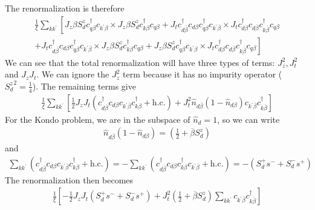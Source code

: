 \documentclass[twoside,11pt]{report}
\numberwithin{equation}{section}
\begin{document}
The renormalization is therefore
\begin{equation}\begin{aligned}
	\frac{1}{\xi}\sum_{kk^\prime} \left[J_z \beta S_d^z c^\dagger_{q\beta}c_{k^\prime\beta}\times J_z \beta S_d^z c^\dagger_{k\beta}c_{q\beta} + J_t  c^\dagger_{d\overline\beta}c_{d\beta} c^\dagger_{q\beta}c_{k^\prime\overline\beta} \times J_t  c^\dagger_{d\beta}c_{d\overline\beta} c^\dagger_{k\overline\beta}c_{q\beta}\right.\\
	+\left. J_t  c^\dagger_{d\overline\beta}c_{d\beta} c^\dagger_{q\beta}c_{k^\prime\overline\beta}\times J_z \beta S_d^z c^\dagger_{k\beta}c_{q\beta} + J_z \beta S_d^z c^\dagger_{q\beta}c_{k^\prime\beta}\times J_t  c^\dagger_{d\beta}c_{d\overline\beta} c^\dagger_{k\overline\beta}c_{q\beta}\right]
\end{aligned}\end{equation}
We can see that the total renormalization will have three types of terms: \(J_z^2, J_t^2\) and \(J_z J_t\). We can ignore the \(J_z^2\) term because it has no impurity operator (\({S_d^z}^2 = \frac{1}{4}\)). The remaining terms give
\begin{equation}\begin{aligned}
	\label{kondo_part}
	\frac{1}{\xi}\sum_{kk^\prime} \left[\frac{1}{2} J_z J_t\left(c^\dagger_{d\overline\beta}c_{d\beta}c_{k^\prime\overline\beta}c^\dagger_{k\beta} + \text{h.c.}\right) + J_t^2 \hat n_{d\overline\beta}\left(1 - \hat n_{d\beta}\right) c_{k^\prime\overline\beta}c^\dagger_{k\overline\beta}\right]
\end{aligned}\end{equation}
For the Kondo problem, we are in the subspace of \(\hat n_d= 1\), so we can write
\begin{equation}\begin{aligned}
	\hat n_{d\overline\beta}\left(1 - \hat n_{d\beta}\right) = \left(\frac{1}{2} +  \overline\beta S_d^z \right)
\end{aligned}\end{equation}
and
\begin{equation}\begin{aligned}
	\sum_{kk^\prime}\left( c^\dagger_{d\overline\beta}c_{d\beta}c_{k^\prime\overline\beta}c^\dagger_{k\beta} + \text{h.c.}\right) = -\sum_{kk^\prime}\left( c^\dagger_{d\overline\beta}c_{d\beta}c^\dagger_{k\beta}c_{k^\prime\overline\beta} + \text{h.c.}\right) = -\left(S_d^+ s^- + S_d^- s^+\right)
\end{aligned}\end{equation}
The renormalization then becomes
\begin{equation}\begin{aligned}
	\frac{1}{\xi} \left[-\frac{1}{2} J_z J_t\left(S_d^+ s^- + S_d^- s^+\right) + J_t^2 \left(\frac{1}{2} +  \overline\beta S_d^z \right) \sum_{kk^\prime}c_{k^\prime\overline\beta}c^\dagger_{k\overline\beta}\right]
\end{aligned}\end{equation}
\end{document}

